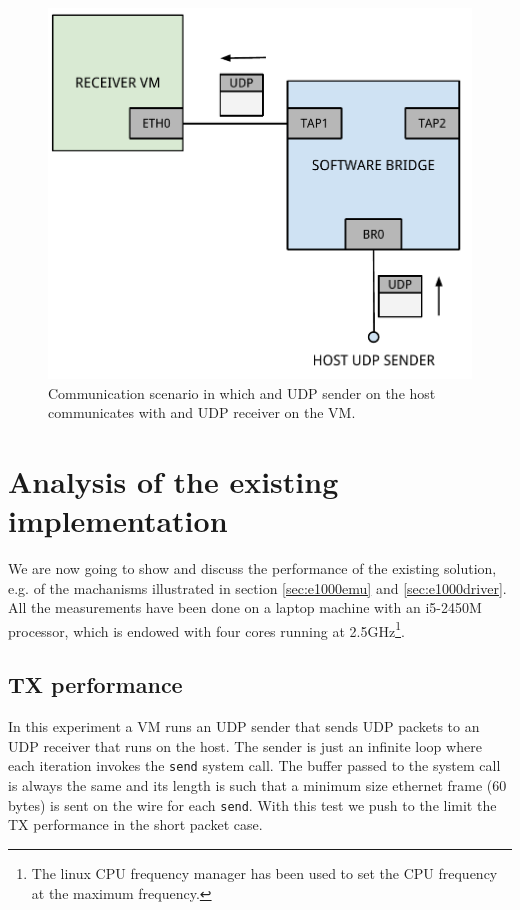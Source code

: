 \begin{figure}[bt]
\centering
\includegraphics[scale = 0.60]{scenario-2.pdf}
\caption{Communication scenario in which and UDP sender on the host communicates with and UDP receiver on the VM.}
\label{fig:scenario-2}
\end{figure}


\section{Analysis of the existing implementation}
\label{sec:e1000perf}
We are now going to show and discuss the performance of the existing solution, e.g. of the machanisms illustrated in section 
\ref{sec:e1000emu} and \ref{sec:e1000driver}.
All the measurements have been done on a laptop machine with an i5-2450M processor, which is endowed with four cores running at 
2.5GHz\footnote{The linux CPU frequency manager has been used to set the CPU frequency at the maximum frequency.}.

\subsection{TX performance}
\label{sec:e1000txperf}
In this experiment a VM runs an UDP sender that sends UDP packets to an UDP receiver that runs on the host. The sender is just an 
infinite loop where each iteration invokes the \texttt{send} system call. The buffer passed to the system call is always the same and its
length is such that a minimum size ethernet frame (60 bytes) is sent on the wire for each \texttt{send}.
With this test we push to the limit the TX performance in the short packet case.


